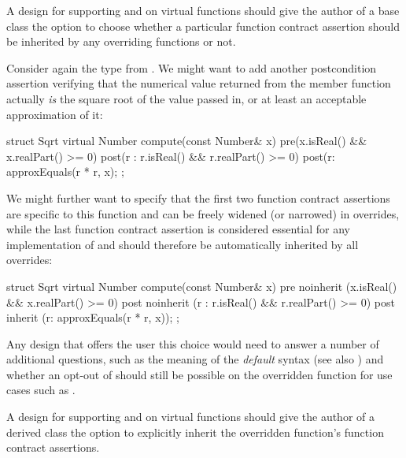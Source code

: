  
A design for supporting  and  on virtual functions should give the author of a base class the option to choose whether a particular function contract assertion should be inherited by any overriding functions or not.

Consider again the  type from . We might want to add another postcondition assertion verifying that the numerical value returned from the  member function actually \emph{is} the square root of the value passed in, or at least an acceptable approximation of it:

\begin{codeblock}
struct Sqrt {
  virtual Number compute(const Number& x)
    pre(x.isReal() && x.realPart() >= 0)
    post(r : r.isReal() && r.realPart() >= 0)
    post(r: approxEquals(r * r, x);
};
\end{codeblock}

We might further want to specify that the first two function contract assertions are specific to this function and can be freely widened (or narrowed) in overrides, while the last function contract assertion is considered essential for any implementation of  and should therefore be automatically inherited by all overrides:

\begin{codeblock}
struct Sqrt {
  virtual Number compute(const Number& x)
    pre noinherit (x.isReal() && x.realPart() >= 0)
    post noinherit (r : r.isReal() && r.realPart() >= 0)
    post inherit (r: approxEquals(r * r, x));
};
\end{codeblock}

Any design that offers the user this choice would need to answer a number of additional questions, such as the meaning of the \emph{default} syntax (see also ) and whether an opt-out of  should still be possible on the overridden function for use cases such as .


A design for supporting  and  on virtual functions should give the author of a derived class the option to explicitly inherit the overridden function's function contract assertions.


